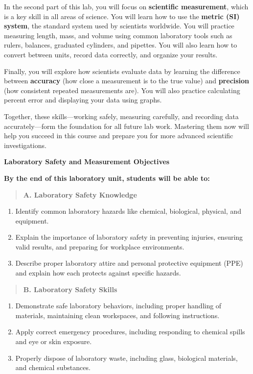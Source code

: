 \documentclass[
  letterpaper,
  DIV=11,
  numbers=noendperiod]{scrreprt}
\begin{document}
In the second part of this lab, you will focus on \textbf{scientific
measurement}, which is a key skill in all areas of science. You will
learn how to use the \textbf{metric (SI) system}, the standard system
used by scientists worldwide. You will practice measuring length, mass,
and volume using common laboratory tools such as rulers, balances,
graduated cylinders, and pipettes. You will also learn how to convert
between units, record data correctly, and organize your results.

Finally, you will explore how scientists evaluate data by learning the
difference between \textbf{accuracy} (how close a measurement is to the
true value) and \textbf{precision} (how consistent repeated measurements
are). You will also practice calculating percent error and displaying
your data using graphs.

Together, these skills---working safely, measuring carefully, and
recording data accurately---form the foundation for all future lab work.
Mastering them now will help you succeed in this course and prepare you
for more advanced scientific investigations.

\textbf{Laboratory Safety and Measurement Objectives}

\textbf{By the end of this laboratory unit, students will be able to:}

\begin{quote}
\textbf{A. Laboratory Safety Knowledge}
\end{quote}

\begin{enumerate}
\def\labelenumi{\arabic{enumi}.}
\item
  Identify common laboratory hazards like chemical, biological,
  physical, and equipment.
\item
  Explain the importance of laboratory safety in preventing injuries,
  ensuring valid results, and preparing for workplace environments.
\item
  Describe proper laboratory attire and personal protective equipment
  (PPE) and explain how each protects against specific hazards.
\end{enumerate}

\begin{quote}
\textbf{B. Laboratory Safety Skills}
\end{quote}

\begin{enumerate}
\def\labelenumi{\arabic{enumi}.}
\item
  Demonstrate safe laboratory behaviors, including proper handling of
  materials, maintaining clean workspaces, and following instructions.
\item
  Apply correct emergency procedures, including responding to chemical
  spills and eye or skin exposure.
\item
  Properly dispose of laboratory waste, including glass, biological
  materials, and chemical substances.
\end{enumerate}
\end{document}
